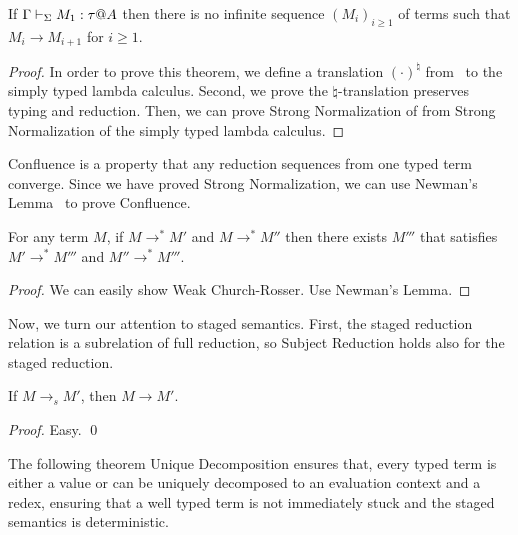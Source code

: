 \begin{theorem}
	If $\G\V M_1:\tau@A$ then there is no infinite sequence $(M_i)_{i\ge1}$ of terms such that
	$M_i \longrightarrow M_{i+1}$ for $i\ge 1$.
\end{theorem}

\begin{proof}
	In order to prove this theorem, we define a translation $(\cdot)^\natural$ from \LMD\ to the simply typed lambda calculus.
	Second, we prove the $\natural$-translation preserves typing and reduction.
	Then, we can prove Strong Normalization of \LMD from Strong Normalization of the simply typed lambda calculus.
\end{proof}

Confluence is a property that any reduction sequences from one typed term converge.
Since we have proved Strong Normalization, we can use Newman's Lemma~\cite{} to prove Confluence.

\begin{theorem}[Confluence]
	For any term $M$, if $M \longrightarrow^* M'$ and $M \longrightarrow^* M''$ then
	there exists $M'''$ that satisfies $M' \longrightarrow^* M'''$ and $M'' \longrightarrow^* M'''$.
\end{theorem}

\begin{proof}
  We can easily show Weak Church-Rosser.  Use Newman's Lemma.
\end{proof}

Now, we turn our attention to staged semantics.  First, the staged
reduction relation is a subrelation of full reduction, so Subject
Reduction holds also for the staged reduction.

\begin{theorem}
  If $M \longrightarrow_s M'$, then $M \longrightarrow M'$.
\end{theorem}
\begin{proof}
  Easy.
 \qed
\end{proof}

The following theorem Unique Decomposition ensures that, every typed
term is either a value or can be uniquely decomposed to an evaluation
context and a redex, ensuring that a well typed term is not
immediately stuck and the staged semantics is deterministic.


